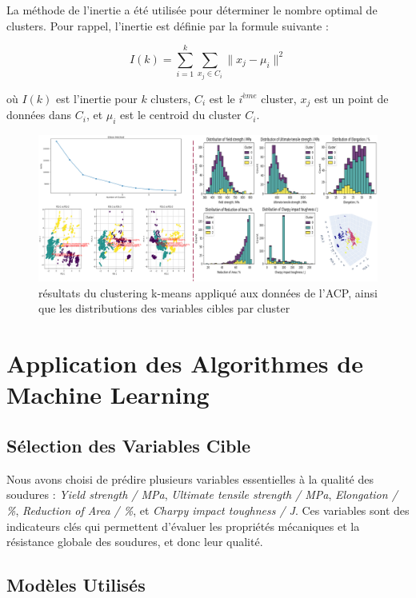 \documentclass{article}
\begin{document}
La méthode de l'inertie a été utilisée pour déterminer le nombre optimal de clusters. Pour rappel, l'inertie est définie par la formule suivante :

\[
I(k) = \sum_{i=1}^{k} \sum_{x_j \in C_i} \| x_j - \mu_i \|^2
\]

où \(I(k)\) est l'inertie pour \(k\) clusters, \(C_i\) est le \(i^{ème}\) cluster, \(x_j\) est un point de données dans \(C_i\), et \(\mu_i\) est le centroid du cluster \(C_i\).

\begin{figure}[H]
    \centering
    \includegraphics[width=\textwidth]{images/clustering.png}
    \caption{résultats du clustering k-means appliqué aux données de l'ACP, ainsi que les distributions des variables cibles par cluster}
    \label{fig:inertia}
\end{figure}

\section{Application des Algorithmes de Machine Learning}

\subsection{Sélection des Variables Cible}

Nous avons choisi de prédire plusieurs variables essentielles à la qualité des soudures : \textit{Yield strength / MPa}, \textit{Ultimate tensile strength / MPa}, \textit{Elongation / \%}, \textit{Reduction of Area / \%}, et \textit{Charpy impact toughness / J}. Ces variables sont des indicateurs clés qui permettent d’évaluer les propriétés mécaniques et la résistance globale des soudures, et donc leur qualité.

\subsection{Modèles Utilisés}
\end{document}
